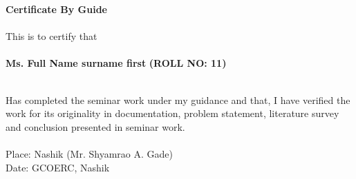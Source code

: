 		\thisfancypage{\setlength{\fboxsep}{10pt}\doublebox}{}	
		\begin{titlepage}
		\begin{center}
		\vspace*{0.3in}
		{\large \bf Certificate By Guide}\\
		\vspace*{0.2 in}\\
		This is to certify that\\
		\vspace*{0.2 in}\\
		{\bf Ms. Full Name surname first } \hspace{0.1in} {\bf (ROLL NO: 11)}\\
		
		\end{center}
		\vspace*{0.2 in}\\
		\hspace*{0.25 in} Has completed the seminar work under my guidance and that, I have verified the work for its originality in documentation, problem statement, literature survey and conclusion presented in seminar work.\\
		\vspace*{0.3}\\
		\hspace*{0.2in} Place: Nashik \hspace*{2.6in}(Mr. Shyamrao A. Gade)\\
		\hspace*{0.2in} Date: \hspace*{3.2 in}GCOERC, Nashik
		\end{titlepage}